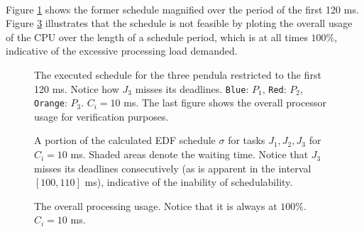 \noindent{}\\


Figure \ref{fig:02.5.3.small} shows the former schedule magnified over the
period of the first 120 ms. Figure \ref{fig:02.5.4} illustrates that the schedule
is not feasible by ploting the overall usage of the CPU over the length of a
schedule period, which is at all times $100\%$, indicative of the excessive
processing load demanded.

\begin{sidewaysfigure}

  \begin{figure}[H]\centering
    \scalebox{1}{}
    \caption{The executed schedule for the three pendula restricted to the first
      120 ms. Notice how $J_3$ misses its deadlines.
      \texttt{Blue}: $P_1$, \texttt{Red}: $P_2$,
      \texttt{Orange}: $P_3$. $C_i = 10$ ms. The last figure shows the overall
      processor usage for verification purposes.}
  \label{fig:02.5.3.small}
  \end{figure}

  \begin{figure}[H]\centering
    \scalebox{0.7}{}
    \caption{A portion of the calculated EDF schedule $\sigma$ for tasks
      $J_1, J_2, J_3$ for $C_i = 10$ ms. Shaded areas denote the waiting time.
      Notice that $J_3$ misses its deadlines consecutively (as is apparent in
      the interval $[100, 110]$ ms), indicative of the inability of
      schedulability.}
    \label{fig:edf_10}
  \end{figure}
\end{sidewaysfigure}

\begin{figure}[H]\centering
  \scalebox{0.7}{}
  \caption{The overall processing usage. Notice that it is always at $100\%$.
    $C_i = 10$ ms.}
    \label{fig:02.5.4}
\end{figure}
